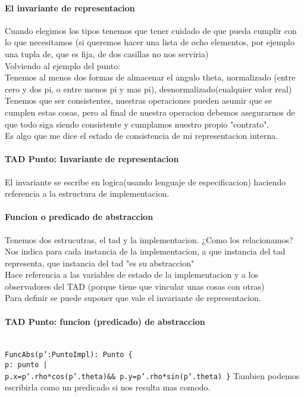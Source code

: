 \documentclass[10pt,a4paper]{article}
\begin{document}
\paragraph*{El invariante de representacion}
Cuando elegimos los tipos tenemos que tener cuidado de que pueda cumplir con lo que necesitamos (si queremos hacer una lista de ocho elementos, por ejemplo una tupla de, que es fija, de dos casillas no nos serviria)
\\Volviendo al ejemplo del punto:
\\Tenemos al menos dos formas de almacenar el angulo theta, normalizado (entre cero y dos pi, o entre menos pi y mas pi), desnormalizado(cualquier valor real)
\\Tenemos que ser consistentes, nuestras operaciones pueden asumir que se cumplen estas cosas, pero al final de nuestra operacion debemos asegurarnos de que todo siga siendo consistente y cumplamos nuestro propio "contrato".
\\Es algo que me dice el estado de consistencia de mi representacion interna.
\paragraph*{TAD Punto: Invariante de representacion}
El invariante se escribe en logica(usando lenguaje de especificacion) haciendo referencia a la estructura de implementacion.
\texttt{
    \\}
\paragraph*{Funcion o predicado de abstraccion}Tenemos dos estrucutras, el tad y la implementacion. ¿Como los relacionamos?
\\Nos indica para cada instancia de la implementacion, a que instancia del tad representa, que instancia del tad "es su abstraccion"
\\Hace referencia a las variables de estado de la implementacion y a los observadores del TAD (porque tiene que vincular unas cosas con otras)
\\Para definir se puede suponer que vale el invariante de representacion.
\paragraph*{TAD Punto: funcion (predicado) de abstraccion}
\texttt{\\FuncAbs(p':PuntoImpl): Punto \{
\\p: punto |\\
\hspace*{2em}p.x=p'.rho*cos(p'.theta)\&\& p.y=p'.rho*sin(p'.theta)
\}}
Tambien podemos escribirla como un predicado si nos resulta mas comodo.
\end{document}
